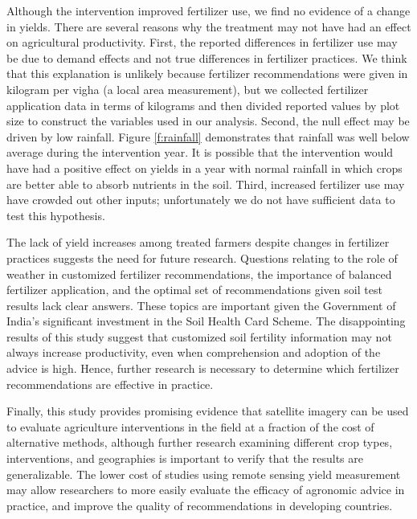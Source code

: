 \documentclass{article}
\begin{document}
Although the intervention improved fertilizer use, we find no evidence of a change in yields. There are several reasons why the treatment may not have had an effect on agricultural productivity. First, the reported differences in fertilizer use may be due to demand effects and not true differences in fertilizer practices. We think that this explanation is unlikely because fertilizer recommendations were given in kilogram per vigha (a local area measurement), but we collected fertilizer application data in terms of kilograms and then divided reported values by plot size to construct the variables used in our analysis. Second, the null effect may be driven by low rainfall. Figure \ref{f:rainfall} demonstrates that rainfall was well below average during the intervention year. It is possible that the intervention would have had a positive effect on yields in a year with normal rainfall in which crops are better able to absorb nutrients in the soil. Third, increased fertilizer use may have crowded out other inputs; unfortunately we do not have sufficient data to test this hypothesis. 

The lack of yield increases among treated farmers despite changes in fertilizer practices suggests the need for future research. Questions relating to the role of weather in customized fertilizer recommendations, the importance of balanced fertilizer application, and the optimal set of recommendations given soil test results lack clear answers. These topics are important given the Government of India’s significant investment in the Soil Health Card Scheme. The disappointing results of this study suggest that customized soil fertility information may not always increase productivity, even when comprehension and adoption of the advice is high. Hence, further research is necessary to determine which fertilizer recommendations are effective in practice. 

Finally, this study provides promising evidence that satellite imagery can be used to evaluate agriculture interventions in the field at a fraction of the cost of alternative methods, although further research examining different crop types, interventions, and geographies is important to verify that the results are generalizable. The lower cost of studies using remote sensing yield measurement may allow researchers to more easily evaluate the efficacy of agronomic advice in practice, and improve the quality of recommendations in developing countries.

\clearpage
\pagebreak
\end{document}
